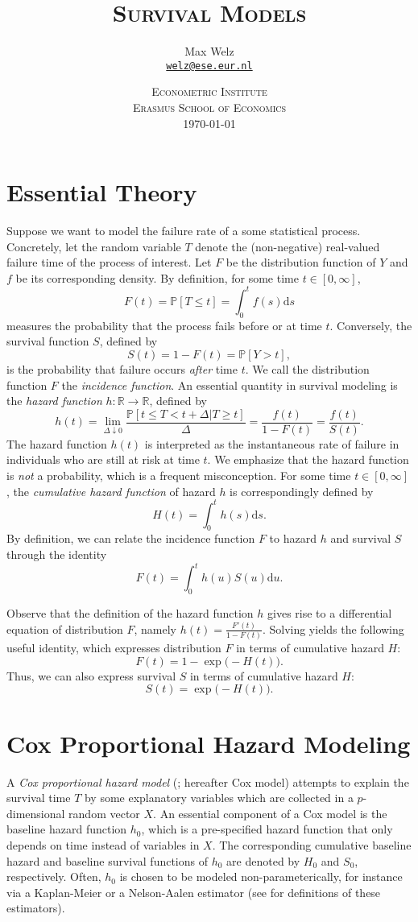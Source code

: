 \documentclass[11pt]{article}
\title{\textsc{Survival Models}}
\author{Max Welz \\
  \href{mailto:welz@ese.eur.nl}{\texttt{welz@ese.eur.nl}}}
\date{%
    \textsc{Econometric Institute\\ Erasmus School of Economics}\\[2ex]%
    \today}
\renewcommand{\P}{\mathbb{P}}
\newcommand{\R}{\mathbb{R}}
\renewcommand{\d}{\text{d}}
\begin{document}
\maketitle

\section{Essential Theory}
Suppose we want to model the failure rate of a some statistical process. Concretely, let the random variable $T$ denote the (non-negative) real-valued failure time of the process of interest. Let $F$ be the distribution function of $Y$ and $f$ be its corresponding density. By definition, for some time $t\in[0, \infty]$,
\[
    F(t) = \P[T \leq t]
    =
    \int_0^t f(s)\d s
\]
measures the probability that the process fails before or at time $t$. Conversely, the survival function $S$, defined by
\[
    S(t) = 1 - F(t) = \P[Y > t],
\]
is the probability that failure occurs \textit{after} time $t$. We call the distribution function $F$ the \textit{incidence function}. An essential quantity in survival modeling is the \textit{hazard function} $h:\R\to\R$, defined by
\[
    h(t) = \lim_{\Delta \downarrow 0}\frac{\P[t \leq T < t + \Delta | T \geq t]}{\Delta} = \frac{f(t)}{1-F(t)} = \frac{f(t)}{S(t)}.
\]
The hazard function $h(t)$ is interpreted as the instantaneous rate of failure in individuals who are still at risk at time $t$. We emphasize that the hazard function is \textit{not} a probability, which is a frequent misconception. For some time $t\in[0, \infty]$, the \textit{cumulative hazard function} of hazard $h$ is correspondingly defined by
\[
    H(t) = \int_0^t h(s) \d s.
\]
By definition, we can relate the incidence function $F$ to hazard $h$ and survival $S$ through the identity
\[
    F(t) = \int_0^t h(u)S(u) \d u.
\]

Observe that the definition of the hazard function $h$ gives rise to a differential equation of distribution $F$, namely $h(t) = \frac{F'(t)}{1-F(t)}$. Solving yields the following useful identity, which expresses distribution $F$ in terms of cumulative hazard $H$:
\[
    F(t) = 1 - \exp\big( - H(t) \big). 
\]
Thus, we can also express survival $S$ in terms of  cumulative hazard $H$:
\[
    S(t) = \exp \big( - H(t) \big).
\]

\section{Cox Proportional Hazard Modeling}
A \textit{Cox proportional hazard model} (\cite{cox1972}; hereafter Cox model) attempts to explain the survival time $T$ by some explanatory variables which are collected in a $p$-dimensional random vector $X$. An essential component of a Cox model is the baseline hazard function $h_0$, which is a pre-specified hazard function that only depends on time instead of variables in $X$. The corresponding cumulative baseline hazard and baseline survival functions of $h_0$ are denoted by $H_0$ and $S_0$, respectively. Often, $h_0$ is chosen to be modeled non-parameterically, for instance via a Kaplan-Meier or a Nelson-Aalen estimator (see \cite{cameron2005} for definitions of these estimators).
\end{document}
